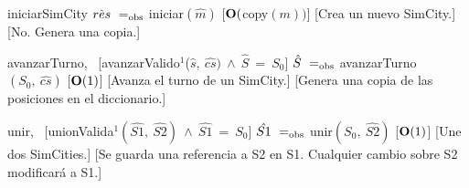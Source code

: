 \begin{Interfaz}
    \InterfazFuncion
    {iniciar}{}{SimCity}
    {$\hat{res}\ \igobs\ $iniciar$(\hat{m})$}
    [$\bold{O}($copy$(m))$]
    [Crea un nuevo SimCity.]
    [No. Genera una copia.]

    \InterfazFuncion
    {avanzarTurno}{,\ }{}
    [avanzarValido$^{1}$($\hat{s},\ \hat{cs})\ \land\ \hat{S}\ =\ S_0$]
    {$\hat{S}\ \igobs\ $avanzarTurno$(S_0,\ \hat{cs})$}
    [$\bold{O}(1)$]
    [Avanza el turno de un SimCity.]
    [Genera una copia de las posiciones en el diccionario.]

    \InterfazFuncion
    {unir}{,\ }{}
    [unionValida$^{1}(\hat{S1},\ \hat{S2})\ \land\ \hat{S1}\ =\ S_0$]
    {$\hat{S1}\ \igobs\ $unir$(S_0,\ \hat{S2})$}
    [$\bold{O}(1)$]
    [Une dos SimCities.]
    [Se guarda una referencia a S2 en S1. Cualquier cambio sobre S2 modificará a S1.]

    \vfill{}
\end{Interfaz}